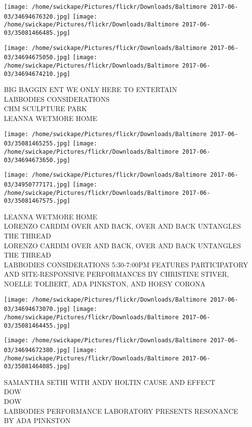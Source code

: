 \documentclass[10pt,letterpaper]{article}
\begin{document}
\texttt{[image: /home/swickape/Pictures/flickr/Downloads/Baltimore 2017-06-03/34694676320.jpg]}
\texttt{[image: /home/swickape/Pictures/flickr/Downloads/Baltimore 2017-06-03/35081466485.jpg]}

\texttt{[image: /home/swickape/Pictures/flickr/Downloads/Baltimore 2017-06-03/34694675050.jpg]}
\texttt{[image: /home/swickape/Pictures/flickr/Downloads/Baltimore 2017-06-03/34694674210.jpg]}

BIG BAGGIN ENT WE ONLY HERE TO ENTERTAIN\\
LABBODIES CONSIDERATIONS\\
CHM SCULPTURE PARK\\
LEANNA WETMORE HOME\\
\pagebreak

\texttt{[image: /home/swickape/Pictures/flickr/Downloads/Baltimore 2017-06-03/35081465255.jpg]}
\texttt{[image: /home/swickape/Pictures/flickr/Downloads/Baltimore 2017-06-03/34694673650.jpg]}

\texttt{[image: /home/swickape/Pictures/flickr/Downloads/Baltimore 2017-06-03/34950777171.jpg]}
\texttt{[image: /home/swickape/Pictures/flickr/Downloads/Baltimore 2017-06-03/35081467575.jpg]}

LEANNA WETMORE HOME\\
LORENZO CARDIM OVER AND BACK, OVER AND BACK UNTANGLES THE THREAD\\
LORENZO CARDIM OVER AND BACK, OVER AND BACK UNTANGLES THE THREAD\\
LABBODIES CONSIDERATIONS 5:30{-}7:00PM FEATURES PARTICIPATORY AND SITE{-}RESPONSIVE PERFORMANCES BY CHRISTINE STIVER, NOELLE TOLBERT, ADA PINKSTON, AND HOESY CORONA\\
\pagebreak

\texttt{[image: /home/swickape/Pictures/flickr/Downloads/Baltimore 2017-06-03/34694673070.jpg]}
\texttt{[image: /home/swickape/Pictures/flickr/Downloads/Baltimore 2017-06-03/35081464455.jpg]}

\texttt{[image: /home/swickape/Pictures/flickr/Downloads/Baltimore 2017-06-03/34694672380.jpg]}
\texttt{[image: /home/swickape/Pictures/flickr/Downloads/Baltimore 2017-06-03/35081464085.jpg]}

SAMANTHA SETHI WITH ANDY HOLTIN CAUSE AND EFFECT\\
DOW\\
DOW\\
LABBODIES PERFORMANCE LABORATORY PRESENTS RESONANCE BY ADA PINKSTON\\
\pagebreak
\end{document}
